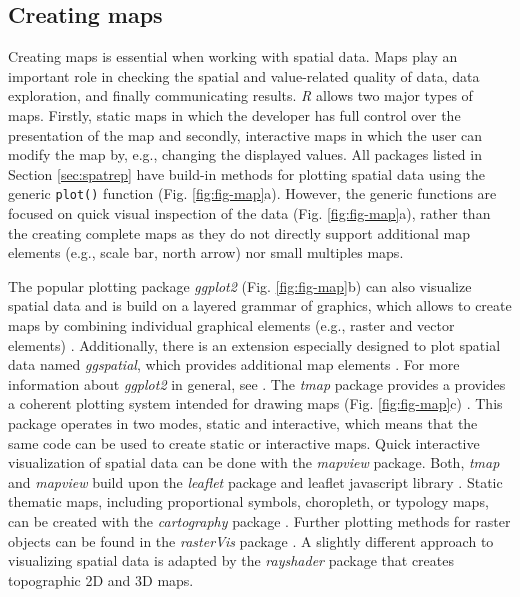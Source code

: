 \documentclass[smallextended]{svjour3}       %
\begin{document}
\hypertarget{creating-maps}{%
\subsection{Creating maps}\label{creating-maps}}

Creating maps is essential when working with spatial data.
Maps play an important role in checking the spatial and value-related quality of data, data exploration, and finally communicating results.
\textit{R} allows two major types of maps.
Firstly, static maps in which the developer has full control over the presentation of the map and secondly, interactive maps in which the user can modify the map by, e.g., changing the displayed values.
All packages listed in Section \ref{sec:spatrep} have build-in methods for plotting spatial data using the generic \texttt{plot()} function (Fig. \ref{fig:fig-map}a).
However, the generic functions are focused on quick visual inspection of the data (Fig. \ref{fig:fig-map}a), rather than the creating complete maps as they do not directly support additional map elements (e.g., scale bar, north arrow) nor small multiples maps.

The popular plotting package \textit{ggplot2} (Fig. \ref{fig:fig-map}b) can also visualize spatial data and is build on a layered grammar of graphics, which allows to create maps by combining individual graphical elements (e.g., raster and vector elements) \cite{Wickham2016}.
Additionally, there is an extension especially designed to plot spatial data named \textit{ggspatial}, which provides additional map elements \cite{Dunnington2020}.
For more information about \textit{ggplot2} in general, see \cite{Wickham2016}.
The \textit{tmap} package provides a provides a coherent plotting system intended for drawing maps (Fig. \ref{fig:fig-map}c) \cite{Tennekes2018}.
This package operates in two modes, static and interactive, which means that the same code can be used to create static or interactive maps.
Quick interactive visualization of spatial data can be done with the \textit{mapview} package\cite{Appelhans2020}.
Both, \textit{tmap} and \textit{mapview} build upon the \textit{leaflet} package and leaflet javascript library \cite{Cheng2021}.
Static thematic maps, including proportional symbols, choropleth, or typology maps, can be created with the \textit{cartography} package \cite{Giraud2016}.
Further plotting methods for raster objects can be found in the \textit{rasterVis} package \cite{Lamigueiro2020}.
A slightly different approach to visualizing spatial data is adapted by the \textit{rayshader} package \cite{Morgen-Wall2020} that creates topographic 2D and 3D maps.
\end{document}
